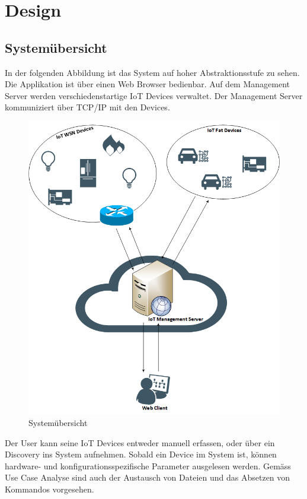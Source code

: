 \chapter{Design}
\section{Systemübersicht}
In der folgenden Abbildung ist das System auf hoher Abstraktionsstufe zu sehen. Die Applikation ist über einen Web Browser bedienbar. Auf dem Management Server werden verschiedenstartige IoT Devices verwaltet. Der Management Server kommuniziert über TCP/IP mit den Devices. 
\begin{figure}[H]
\centering
\includegraphics[scale=0.6]{images/systemuebersicht.png}
\caption{Systemübersicht}
\end{figure}
Der User kann seine IoT Devices entweder manuell erfassen, oder über ein Discovery ins System aufnehmen. Sobald ein Device im System ist, können hardware- und konfigurationsspezifische Parameter ausgelesen werden. Gemäss Use Case Analyse sind auch der Austausch von Dateien und das Absetzen von Kommandos vorgesehen. 
\newpage

